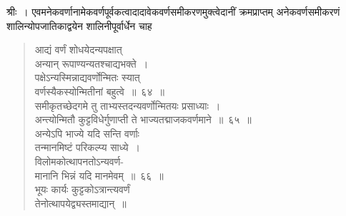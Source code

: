 \documentclass[11pt, openany]{book}
\begin{document}
 \vspace{2mm}
 श्रीः~। एवमनेकवर्णानामेकवर्णपूर्वकत्वादादावेकवर्णसमीकरणमुक्त्वेदानीं क्रमप्राप्तम् अनेकवर्णसमीकरणं शालिन्योपजातिकाद्वयेन शालिनीपूर्वार्धेन चाह\textendash
\begin{quote}
    \bs
      आद्यं वर्णं शोधयेदन्यपक्षात् \\

\vspace{-7mm}
\hspace{0.5cm} अन्यान् रूपाण्यन्यतश्चाद्यभक्ते~। \\

\vspace{-7mm}
 पक्षेऽन्यस्मिन्नाद्यवर्णोन्मितः स्यात् \\

\vspace{-7mm}
\hspace{0.5cm} वर्णस्यैकस्योन्मितीनां बहुत्वे~॥~६४~॥~\\

 \vspace{-5mm}
 समीकृतच्छेदगमे तु ताभ्यस्तदन्यवर्णोन्मितयः प्रसाध्याः~। \\

\vspace{-7mm}
 अन्त्योन्मितौ कुट्टविधेर्गुणाप्ती ते भाज्यतद्माजकवर्णमाने~॥~६५~॥~\\

\vspace{-5mm}
 अन्येऽपि भाज्ये यदि सन्ति वर्णाः \\

\vspace{-7mm}
\hspace{0.5cm} तन्मानमिष्टं परिकल्प्य साध्ये~। \\

\vspace{-7mm}
 विलोमकोत्थापनतोऽन्यवर्ण- \\

\vspace{-7mm}
\hspace{0.5cm} मानानि भिन्नं यदि मानमेवम्~॥~६६~॥~\\

\vspace{-5mm}
 भूयः कार्यः कुट्टकोऽत्रान्त्यवर्णं \\

\vspace{-7mm}
\hspace{0.5cm} तेनोत्थापयेद्व्यस्तमाद्यान्~॥ 
\end{quote}
\end{document}
